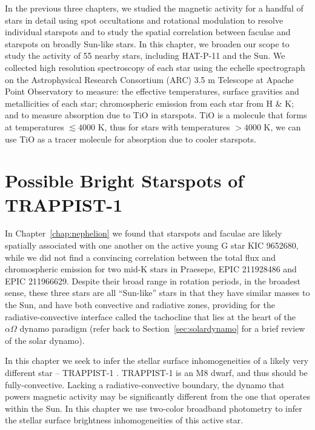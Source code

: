 \documentclass[12pt, twoside]{uwthesis}
\begin{document}
In the previous three chapters, we studied the magnetic activity for a handful of stars in detail using spot occultations and rotational modulation to resolve individual starspots and to study the spatial correlation between faculae and starspots on broadly Sun-like stars. In this chapter, we broaden our scope to study the activity of 55 nearby stars, including HAT-P-11 and the Sun. We collected high resolution spectroscopy of each star using the echelle spectrograph on the Astrophysical Research Consortium (ARC) 3.5 m Telescope at Apache Point Observatory to measure: the effective temperatures, surface gravities and metallicities of each star; chromospheric emission from each star from  H \& K; and to measure absorption due to TiO in starspots. TiO is a molecule that forms at temperatures $\lesssim 4000$ K, thus for stars with temperatures $>4000$ K, we can use TiO as a tracer molecule for absorption due to cooler starspots. 

\chapter{Possible Bright Starspots of TRAPPIST-1} \label{chap:trappist1_bright}

In Chapter~\ref{chap:nephelion} we found that starspots and faculae are likely spatially associated with one another on the active young G star KIC 9652680, while we did not find a convincing correlation between the total flux and chromospheric emission for two mid-K stars in Praesepe, EPIC 211928486 and EPIC 211966629. Despite their broad range in rotation periods, in the broadest sense, these three stars are all ``Sun-like'' stars in that they have similar masses to the Sun, and have both convective and radiative zones, providing for the radiative-convective interface called the tachocline that lies at the heart of the $\alpha\Omega$ dynamo paradigm (refer back to Section~\ref{sec:solardynamo} for a brief review of the solar dynamo). 

In this chapter we seek to infer the stellar surface inhomogeneities of a likely very different star -- TRAPPIST-1 \citep{Gillon2016,Gillon2017}. TRAPPIST-1 is an M8 dwarf, and thus should be fully-convective. Lacking a radiative-convective boundary, the dynamo that powers magnetic activity may be significantly different from the one that operates within the Sun. In this chapter we use two-color broadband photometry to infer the stellar surface brightness inhomogeneities of this active star. 
\end{document}
